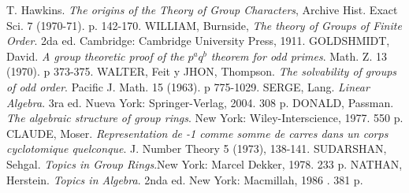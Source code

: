 \begin{thebibliography}{99}
     T. Hawkins. \textit{The origins of the Theory of Group Characters}, Archive Hist. Exact Sci. $7$ (1970-71). p. 142-170.
     WILLIAM, Burnside, \textit{The theory of Groups of Finite Order}. 	2da ed. Cambridge: Cambridge University Press, 1911.
      GOLDSHMIDT, David. \textit{A group theoretic proof of the $p^aq^b$ theorem for odd primes}. Math. Z. 13 (1970). p 373-375.
     WALTER, Feit y JHON, Thompson. \textit{The solvability of groups of odd order}. Pacific J. Math. 15 (1963). p 775-1029.
    SERGE, Lang. \textit{Linear Algebra}. 3ra ed. Nueva York: Springer-Verlag, 2004. 308 p.
     DONALD, Passman. \textit{The algebraic structure of group rings}. New York: Wiley-Interscience, 1977. 550 p.
     CLAUDE, Moser. \textit{Representation de -1 comme somme de carres dans un corps cyclotomique quelconque}. J. Number Theory 5 (1973), 138-141.
     SUDARSHAN, Sehgal.  \textit{Topics in Group Rings}.New York: Marcel Dekker, 1978. 233 p. 
     NATHAN, Herstein. \textit{Topics in Algebra}. 2nda ed.  New York: Macmillah, 1986 . 381 p. 

\end{thebibliography}
